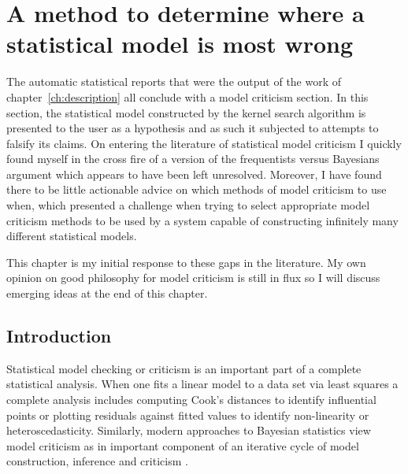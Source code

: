 
\inbpdocument

\chapter{A method to determine where a statistical model is most wrong}
\label{ch:criticism}

The automatic statistical reports that were the output of the work of chapter~\ref{ch:description} all conclude with a model criticism section.
In this section, the statistical model constructed by the kernel search algorithm is presented to the user as a hypothesis and as such it subjected to attempts to falsify its claims.
On entering the literature of statistical model criticism I quickly found myself in the cross fire of a version of the frequentists versus Bayesians argument which appears to have been left unresolved.
Moreover, I have found there to be little actionable advice on which methods of model criticism to use when, which presented a challenge when trying to select appropriate model criticism methods to be used by a system capable of constructing infinitely many different statistical models.

This chapter is my initial response to these gaps in the literature.
My own opinion on good philosophy for model criticism is still in flux so I will discuss emerging ideas at the end of this chapter.

\section{Introduction}

Statistical model checking or criticism\footnotemark{} is an important part of a complete statistical analysis.
When one fits a linear model to a data set via least squares a complete analysis includes computing \eg Cook's distances \cite{Cook1982-ia} to identify influential points or plotting residuals against fitted values to identify non-linearity or heteroscedasticity.
Similarly, modern approaches to Bayesian statistics view model criticism as in important component of an iterative cycle of model construction, inference and criticism \citep{Gelman2013-st}.

